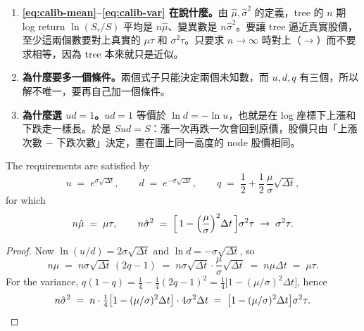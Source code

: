 \suppstart
\begin{remark}
	\begin{enumerate}[(1),nosep]
		\item \textbf{\eqref{eq:calib-mean}--\eqref{eq:calib-var} 在說什麼。}由 $\hat{\mu},\hat{\sigma}^{2}$ 的定義，tree 的 $n$ 期 log return $\ln(S_{\tau}/S)$ 平均是 $n\hat{\mu}$、變異數是 $n\hat{\sigma}^{2}$。要讓 tree 逼近真實股價，至少這兩個數要對上真實的 $\mu\tau$ 和 $\sigma^{2}\tau$。只要求 $n\to\infty$ 時對上（$\to$）而不要求相等，因為 tree 本來就只是近似。
		\item \textbf{為什麼要多一個條件。}兩個式子只能決定兩個未知數，而 $u,d,q$ 有三個，所以解不唯一，要再自己加一個條件。
		\item \textbf{為什麼選 $ud=1$。}$ud=1$ 等價於 $\ln d=-\ln u$，也就是在 log 座標下上漲和下跌走一樣長。於是 $Sud=S$：漲一次再跌一次會回到原價，股價只由「上漲次數 $-$ 下跌次數」決定，畫在圖上同一高度的 node 股價相同。
	\end{enumerate}
\end{remark}
\suppend

\begin{proposition}
	\label{prop:crr}
	The requirements are satisfied by
	\begin{equation}
		u \;=\; e^{\sigma\sqrt{\Delta t}} ,
		\qquad
		d \;=\; e^{-\sigma\sqrt{\Delta t}} ,
		\qquad
		q \;=\; \frac{1}{2}+\frac{1}{2}\,\frac{\mu}{\sigma}\sqrt{\Delta t} ,
		\label{eq:crr}
	\end{equation}
	for which
	\[
		n\hat{\mu} \;=\; \mu\tau ,
		\qquad
		n\hat{\sigma}^{2} \;=\; \Bigl[\,1-\Bigl(\frac{\mu}{\sigma}\Bigr)^{2}\Delta t\,\Bigr]\sigma^{2}\tau \;\to\; \sigma^{2}\tau .
	\]
\end{proposition}

\suppstart
\begin{proof}
	Now $\ln(u/d)=2\sigma\sqrt{\Delta t}$ and $\ln d=-\sigma\sqrt{\Delta t}$, so
	\[
		n\hat{\mu} \;=\; n\sigma\sqrt{\Delta t}\,(2q-1) \;=\; n\sigma\sqrt{\Delta t}\cdot\frac{\mu}{\sigma}\sqrt{\Delta t} \;=\; n\mu\Delta t \;=\; \mu\tau .
	\]
	For the variance, $q(1-q)=\frac14-\frac14(2q-1)^{2}=\frac14\bigl[1-(\mu/\sigma)^{2}\Delta t\bigr]$, hence
	\[
		n\hat{\sigma}^{2} \;=\; n\cdot\tfrac14\bigl[1-(\mu/\sigma)^{2}\Delta t\bigr]\cdot4\sigma^{2}\Delta t \;=\; \bigl[1-(\mu/\sigma)^{2}\Delta t\bigr]\sigma^{2}\tau .
		\qedhere
	\]
\end{proof}

